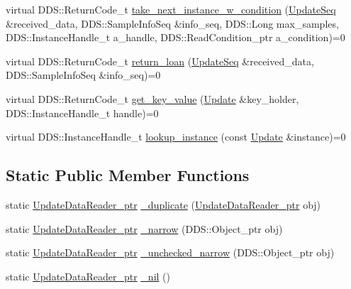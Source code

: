 \begin{DoxyCompactItemize}
\item 
virtual DDS::ReturnCode\_\-t \hyperlink{classKnowledge_1_1UpdateDataReader_a96fb568a9968f486076820455880e410}{take\_\-next\_\-instance\_\-w\_\-condition} (\hyperlink{namespaceKnowledge_ab62e46316b954f0d249e0e45de7059dc}{UpdateSeq} \&received\_\-data, DDS::SampleInfoSeq \&info\_\-seq, DDS::Long max\_\-samples, DDS::InstanceHandle\_\-t a\_\-handle, DDS::ReadCondition\_\-ptr a\_\-condition)=0
\item 
virtual DDS::ReturnCode\_\-t \hyperlink{classKnowledge_1_1UpdateDataReader_a8d6fa29703342018a59ccf1d70dee7c2}{return\_\-loan} (\hyperlink{namespaceKnowledge_ab62e46316b954f0d249e0e45de7059dc}{UpdateSeq} \&received\_\-data, DDS::SampleInfoSeq \&info\_\-seq)=0
\item 
virtual DDS::ReturnCode\_\-t \hyperlink{classKnowledge_1_1UpdateDataReader_adaf4a81ae777f656dadd82dd5dceca36}{get\_\-key\_\-value} (\hyperlink{structKnowledge_1_1Update}{Update} \&key\_\-holder, DDS::InstanceHandle\_\-t handle)=0
\item 
virtual DDS::InstanceHandle\_\-t \hyperlink{classKnowledge_1_1UpdateDataReader_a2d59c6eed5ace0ad6b4bd8fa17fb0991}{lookup\_\-instance} (const \hyperlink{structKnowledge_1_1Update}{Update} \&instance)=0
\end{DoxyCompactItemize}
\subsection*{Static Public Member Functions}
\begin{DoxyCompactItemize}
\item 
static \hyperlink{classKnowledge_1_1UpdateDataReader}{UpdateDataReader\_\-ptr} \hyperlink{classKnowledge_1_1UpdateDataReader_a993f2375983266927ca22f109ebd57a8}{\_\-duplicate} (\hyperlink{classKnowledge_1_1UpdateDataReader}{UpdateDataReader\_\-ptr} obj)
\item 
static \hyperlink{classKnowledge_1_1UpdateDataReader}{UpdateDataReader\_\-ptr} \hyperlink{classKnowledge_1_1UpdateDataReader_aae79abdf6d1190981cd0213eedcbcaa1}{\_\-narrow} (DDS::Object\_\-ptr obj)
\item 
static \hyperlink{classKnowledge_1_1UpdateDataReader}{UpdateDataReader\_\-ptr} \hyperlink{classKnowledge_1_1UpdateDataReader_a03462f93a84ec6639253405bd305594e}{\_\-unchecked\_\-narrow} (DDS::Object\_\-ptr obj)
\item 
static \hyperlink{classKnowledge_1_1UpdateDataReader}{UpdateDataReader\_\-ptr} \hyperlink{classKnowledge_1_1UpdateDataReader_a0954b4e17262e54b280c1cdfb9ead129}{\_\-nil} ()
\end{DoxyCompactItemize}
